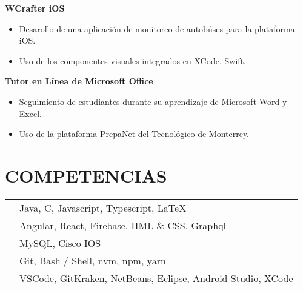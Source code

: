 \documentclass{res}
\begin{document}
\begin{resume}
    \textbf{WCrafter iOS} 
    \begin{itemize}
        \item Desarollo de una aplicación de monitoreo de autobúses para la plataforma iOS.
        \item Uso de los componentes visuales integrados en XCode, Swift.
    \end{itemize}

    \textbf{Tutor en Línea de Microsoft Office} 
    \begin{itemize}
        \item Seguimiento de estudiantes durante su aprendizaje de Microsoft Word y Excel.
        \item Uso de la plataforma PrepaNet del Tecnológico de Monterrey.
    \end{itemize}

    \section{\large{COMPETENCIAS}} 

    \begin{tabularx}{15cm}{SB}
         &
        Java, C, Javascript, Typescript, LaTeX
        \\
         &
        Angular, React, Firebase, HML \& CSS, Graphql
        \\
         &
        MySQL, Cisco IOS
        \\
         &
        Git, Bash / Shell, nvm, npm, yarn
        \\
         &
        VSCode, GitKraken, NetBeans, Eclipse, Android Studio, XCode
    \end{tabularx}
\end{resume}
\end{document}
